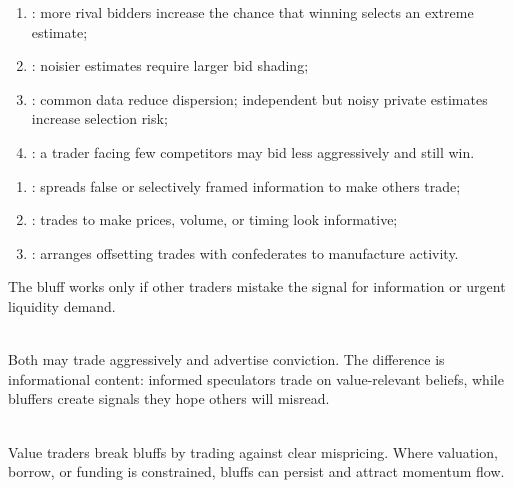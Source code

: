 \begin{taxonomy} 
\begin{enumerate}[label=\roman*.]
\setlength{\itemsep}{0pt}
\item {}: more rival bidders increase the chance that winning selects an extreme estimate;
\item {}: noisier estimates require larger bid shading;
\item {}: common data reduce dispersion; independent but noisy private estimates increase selection risk;
\item {}: a trader facing few competitors may bid less aggressively and still win.
\end{enumerate}
\end{taxonomy}

\begin{taxonomy} 
\begin{enumerate}[label=\roman*.]
\setlength{\itemsep}{0pt}
\item {}: spreads false or selectively framed information to make others trade;
\item {}: trades to make prices, volume, or timing look informative;
\item {}: arranges offsetting trades with confederates to manufacture activity.
\end{enumerate}
The bluff works only if other traders mistake the signal for information or urgent liquidity demand.
\end{taxonomy}

\begin{principle} \\
Both may trade aggressively and advertise conviction. The difference is informational content: informed speculators trade on value-relevant beliefs, while bluffers create signals they hope others will misread.
\end{principle}

\begin{mechanism} \\
Value traders break bluffs by trading against clear mispricing. Where valuation, borrow, or funding is constrained, bluffs can persist and attract momentum flow.
\end{mechanism}

